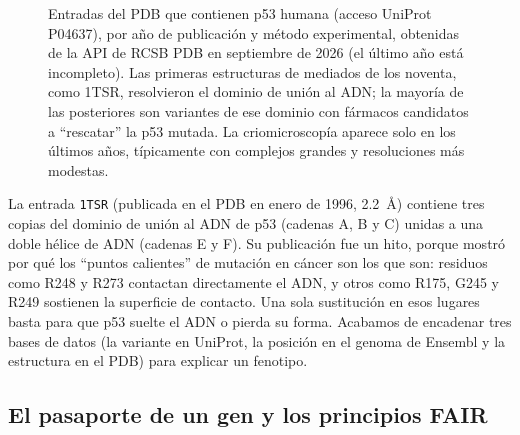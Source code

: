 \begin{figure}[t]
\centering
{}
\caption[Estructuras de p53 en el PDB]{Entradas del PDB que contienen p53 humana (acceso UniProt P04637), por año de publicación y método experimental, obtenidas de la API de RCSB PDB en septiembre de 2026 (el último año está incompleto). Las primeras estructuras de mediados de los noventa, como 1TSR, resolvieron el dominio de unión al ADN; la mayoría de las posteriores son variantes de ese dominio con fármacos candidatos a ``rescatar'' la p53 mutada. La criomicroscopía aparece solo en los últimos años, típicamente con complejos grandes y resoluciones más modestas.}
\label{fig:02-pdb}
\end{figure}

La entrada \texttt{1TSR} (publicada en el PDB en enero de 1996, \SI{2,2}{\angstrom}) contiene tres copias del dominio de unión al ADN de p53 (cadenas A, B y C) unidas a una doble hélice de ADN (cadenas E y F). Su publicación \parencite{c02-cho1994} fue un hito, porque mostró por qué los ``puntos calientes'' de mutación en cáncer son los que son: residuos como R248 y R273 contactan directamente el ADN, y otros como R175, G245 y R249 sostienen la superficie de contacto. Una sola sustitución en esos lugares basta para que p53 suelte el ADN o pierda su forma. Acabamos de encadenar tres bases de datos (la variante en UniProt, la posición en el genoma de Ensembl y la estructura en el PDB) para explicar un fenotipo.

\subsection{El pasaporte de un gen y los principios FAIR}

